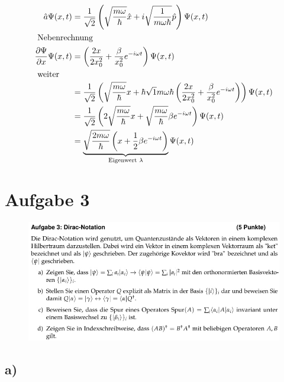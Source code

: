 \begin{align}
    \hat a \Psi (x,t) &= \frac{1}{\sqrt{2}} \left( \sqrt{\frac{ m \omega}{\hbar}} \hat x + i \sqrt{\frac{1}{m \omega \hbar}} \hat p \right) \Psi (x,t)\\
    \intertext{
        Nebenrechnung
    }
    \frac{\partial \Psi}{\partial x} \Psi (x,t) &= \left( \frac{2x}{2 x_0^2}+\frac{\beta}{x_0^2} e^{-i \omega t} \right) \Psi (x,t) \\
    \intertext{
        weiter
    }
    &=\frac{1}{\sqrt{2}} \left(\sqrt{\frac{m \omega}{\hbar}}x + \hbar \sqrt{1}{m \omega \hbar} \left( \frac{2x}{2 x_0^2}+\frac{\beta}{x_0^2} e^{-i \omega t} \right) \right) \Psi (x,t)\\
    &= \frac{1}{\sqrt{2}} \left(2 \sqrt{\frac{m \omega}{\hbar}}x + \sqrt{\frac{m \omega}{\hbar}} \beta e^{-i \omega t} \right) \Psi (x,t)\\
    &=\underbrace{\sqrt{\frac{2 m \omega}{\hbar}} \left(x+\frac{1}{2} \beta e^{-i \omega t} \right)}_{\text{Eigenwert } \lambda} \Psi (x,t)
\end{align}


\section{Aufgabe 3}

    \begin{figure}[H]
        \centering
        \includegraphics[width=\textwidth]{images/Aufgabe3.jpg}
        \label{fig:5}
    \end{figure}

\subsection{a)}

